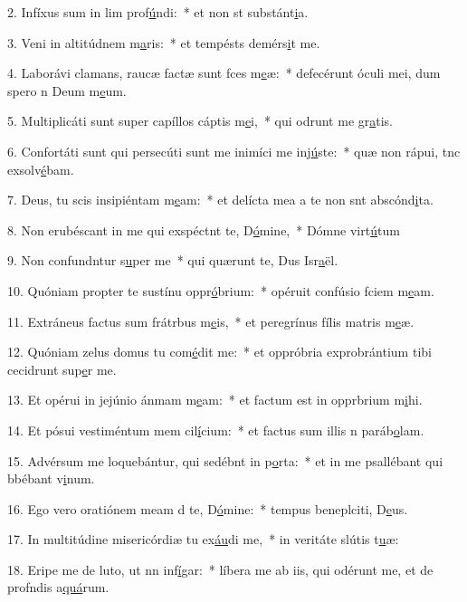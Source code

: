 2. Infíxus sum in lim prof\uline{ú}ndi:~* et non st substánt\uline{i}a.\par 
3. Veni in altitúdnem m\uline{a}ris:~* et tempésts demérs\uline{i}t me.\par 
4. Laborávi clamans, raucæ factæ sunt fces m\uline{e}æ:~* defecérunt óculi mei, dum spero n Deum m\uline{e}um.\par 
5. Multiplicáti sunt super capíllos cáptis m\uline{e}i,~* qui odrunt me gr\uline{a}tis.\par 
6. Confortáti sunt qui persecúti sunt me inimíci me inj\uline{ú}ste:~* quæ non rápui, tnc exsolv\uline{é}bam.\par 
7. Deus, tu scis insipiéntam m\uline{e}am:~* et delícta mea a te non snt abscónd\uline{i}ta.\par 
8. Non erubéscant in me qui exspéctnt te, D\uline{ó}mine,~* Dómne virt\uline{ú}tum\par 
9. Non confundntur s\uline{u}per me~* qui quærunt te, Dus Isr\uline{a}ël.\par 
10. Quóniam propter te sustínu oppr\uline{ó}brium:~* opéruit confúsio fciem m\uline{e}am.\par 
11. Extráneus factus sum frátrbus m\uline{e}is,~* et peregrínus fílis matris m\uline{e}æ.\par 
12. Quóniam zelus domus tu com\uline{é}dit me:~* et oppróbria exprobrántium tibi cecidrunt sup\uline{e}r me.\par 
13. Et opérui in jejúnio ánmam m\uline{e}am:~* et factum est in opprbrium m\uline{i}hi.\par 
14. Et pósui vestiméntum mem cil\uline{í}cium:~* et factus sum illis n paráb\uline{o}lam.\par 
15. Advérsum me loquebántur, qui sedébnt in p\uline{o}rta:~* et in me psallébant qui bbébant v\uline{i}num.\par 
16. Ego vero oratiónem meam d te, D\uline{ó}mine:~* tempus beneplciti, D\uline{e}us.\par 
17. In multitúdine misericórdiæ tu ex\uline{áu}di me,~* in veritáte slútis t\uline{u}æ:\par 
18. Eripe me de luto, ut nn inf\uline{í}gar:~* líbera me ab iis, qui odérunt me, et de profndis a\uline{quá}rum.\par 
